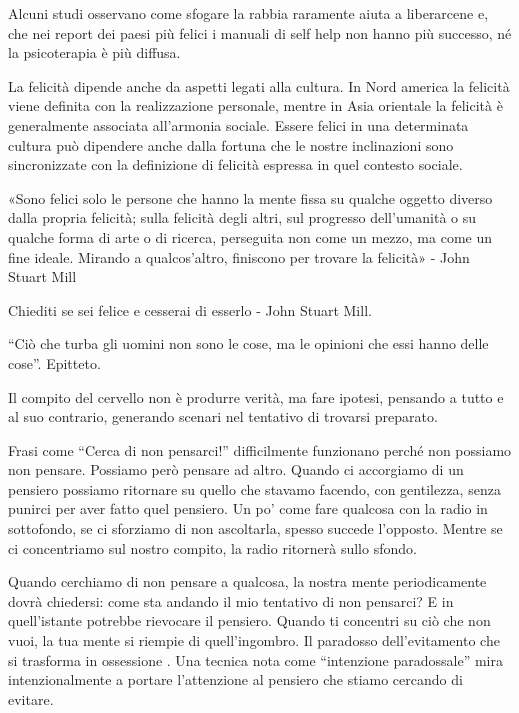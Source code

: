 \documentclass[12pt]{book} %
\begin{document}
Alcuni studi osservano come sfogare la rabbia raramente aiuta a liberarcene e, che nei report dei paesi più felici i manuali di self help non hanno più successo,
né la psicoterapia è più diffusa. 

La felicità dipende anche da aspetti legati alla cultura. In Nord america la felicità viene definita con la realizzazione personale, mentre in Asia orientale la felicità è generalmente associata all'armonia sociale. 
Essere felici in una determinata cultura può dipendere anche dalla fortuna che le nostre inclinazioni sono sincronizzate con la definizione di felicità espressa in quel contesto sociale.

«Sono felici solo le persone che hanno la mente fissa su qualche oggetto diverso dalla propria felicità; sulla felicità degli altri, sul progresso dell’umanità o su qualche forma di arte o di ricerca, perseguita non come un mezzo, ma come un fine ideale. Mirando a qualcos’altro, finiscono per trovare la felicità» - John Stuart Mill

Chiediti se sei felice e cesserai di esserlo - John Stuart Mill.

“Ciò che turba gli uomini non sono le cose, ma le opinioni che essi hanno delle cose”. Epitteto.

Il compito del cervello non è produrre verità, ma fare ipotesi, pensando a tutto e al suo contrario, generando scenari nel tentativo di trovarsi preparato.

Frasi come “Cerca di non pensarci!” difficilmente funzionano perché non possiamo non pensare. Possiamo però pensare ad altro. Quando ci accorgiamo di un pensiero possiamo ritornare su quello che stavamo facendo, con gentilezza, senza punirci per aver fatto quel pensiero. Un po' come fare qualcosa con la radio in sottofondo, se ci sforziamo di non ascoltarla, spesso succede l'opposto. Mentre se ci concentriamo sul nostro compito, la radio ritornerà sullo sfondo.

Quando cerchiamo di non pensare a qualcosa, la nostra mente periodicamente dovrà chiedersi: come sta andando il mio tentativo di non pensarci? E in quell'istante potrebbe rievocare il pensiero. Quando ti concentri su ciò che non vuoi, la tua mente si riempie di quell'ingombro. Il paradosso dell'evitamento che si trasforma in ossessione . Una tecnica nota come “intenzione paradossale” mira intenzionalmente a portare l'attenzione al pensiero che stiamo cercando di evitare. 
\end{document}
